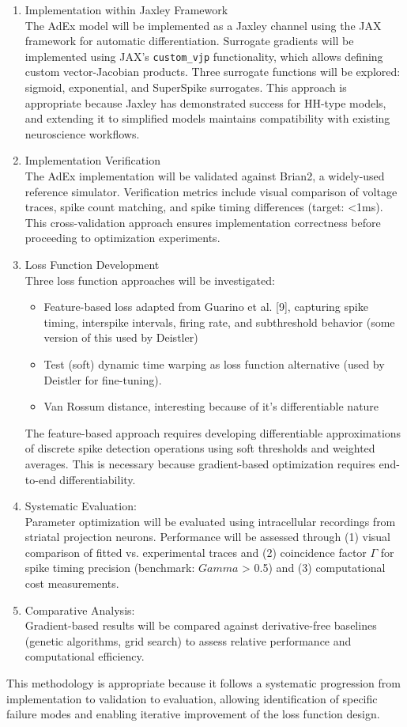 \documentclass{article}
\begin{document}
\begin{enumerate}
  \item Implementation within Jaxley Framework\\
The AdEx model will be implemented as a Jaxley channel using the JAX framework for automatic differentiation.
Surrogate gradients will be implemented using JAX's \verb|custom_vjp| functionality, which allows defining custom vector-Jacobian products.
Three surrogate functions will be explored: sigmoid, exponential, and SuperSpike surrogates.
This approach is appropriate because Jaxley has demonstrated success for HH-type models, and extending it to simplified models maintains compatibility with existing neuroscience workflows.
  \item Implementation Verification\\
The AdEx implementation will be validated against Brian2, a widely-used reference simulator.
Verification metrics include visual comparison of voltage traces, spike count matching, and spike timing differences (target: <1ms).
This cross-validation approach ensures implementation correctness before proceeding to optimization experiments.
  \item Loss Function Development\\
Three loss function approaches will be investigated:
\begin{itemize}
  \item Feature-based loss adapted from Guarino et al. [9], capturing spike timing, interspike intervals, firing rate, and subthreshold behavior (some version of this used by Deistler)
  \item Test (soft) dynamic time warping as loss function alternative (used by Deistler for fine-tuning).
  \item Van Rossum distance, interesting because of it's differentiable nature
\end{itemize}
The feature-based approach requires developing differentiable approximations of discrete spike detection operations using soft thresholds and weighted averages.
This is necessary because gradient-based optimization requires end-to-end differentiability.
\item Systematic Evaluation:\\
Parameter optimization will be evaluated using intracellular recordings from striatal projection neurons.
Performance will be assessed through
(1) visual comparison of fitted vs. experimental traces and
(2) coincidence factor $\Gamma$ for spike timing precision (benchmark: $Gamma$ > 0.5) and
(3) computational cost measurements.
\item Comparative Analysis:\\
Gradient-based results will be compared against derivative-free baselines (genetic algorithms, grid search) to assess relative performance and computational efficiency.
\end{enumerate}
This methodology is appropriate because it follows a systematic progression from implementation to validation to evaluation, allowing identification of specific failure modes and enabling iterative improvement of the loss function design.
\end{document}
